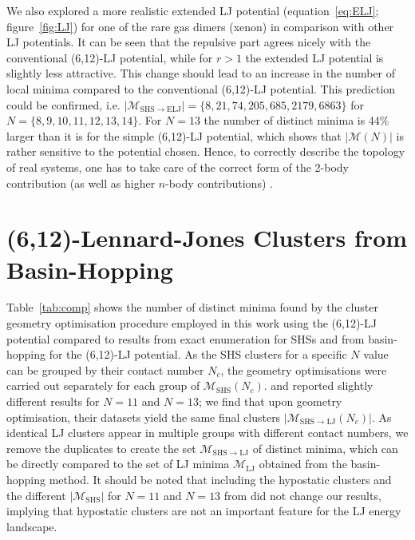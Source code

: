 We also explored a more realistic extended \ac{LJ} potential
(equation~\eqref{eq:ELJ}; figure~\ref{fig:LJ}) for one of the rare gas dimers
(xenon) in comparison with other \ac{LJ} potentials. It can be seen that the
repulsive part agrees nicely with the conventional (6,12)-\ac{LJ} potential,
while for $r > 1$ the extended \ac{LJ} potential is slightly less attractive.
This change should lead to an increase in the number of local minima compared to
the conventional (6,12)-\ac{LJ} potential. This prediction could be confirmed,
i.e. $|\mathcal{M}_\mathrm{SHS\to ELJ}|=\{8,21,74,205,685,2179,6863\}$ for
$N=\{8,9,10,11,12,13,14\}$. For $N=13$ the number of distinct minima is 44\%
larger than it is for the simple (6,12)-\ac{LJ} potential, which shows that
$|\mathcal{M}(N)|$ is rather sensitive to the potential chosen. Hence, to
correctly describe the topology of real systems, one has to take care of the
correct form of the 2-body contribution (as well as higher $n$-body
contributions) \autocite{Schwerdtfeger-2016}.


\section{(6,12)-Lennard-Jones Clusters from Basin-Hopping} 
\label{sec:612LennardJonesClustersfromBasinHopping}

Table~\ref{tab:comp} shows the number of distinct minima found by the cluster
geometry optimisation procedure employed in this work using the (6,12)-\ac{LJ}
potential compared to results from exact enumeration for \ac{SHS}s and from
basin-hopping for the (6,12)-\ac{LJ} potential. As the \ac{SHS} clusters for a
specific $N$ value can be grouped by their contact number $N_c$, the geometry
optimisations were carried out separately for each group of
$\mathcal{M}_\mathrm{SHS}(N_c)$.
\citeauthor{Hoy_Structurefinitesphere_2012}
\autocite{Hoy_Structurefinitesphere_2012,Hoy_Structuredynamicsmodel_2015} and
\citeauthor{Holmes-Cerfon_EnumeratingRigidSphere_2016}\autocite{Holmes-Cerfon_EnumeratingRigidSphere_2016}
reported slightly different results for $N=11$ and $N=13$; we find that upon
geometry optimisation, their datasets yield the same final clusters
$|\mathcal{M}_{\mathrm{SHS\to LJ}}(N_c)|$. As identical \ac{LJ} clusters appear
in multiple groups with different contact numbers, we remove the duplicates to
create the set $\mathcal{M}_\mathrm{SHS\to LJ}$ of distinct minima, which can be
directly compared to the set of \ac{LJ} minima $\mathcal{M}_\mathrm{LJ}$
obtained from the basin-hopping method. It should be noted that including the
hypostatic clusters and the different $|\mathcal{M}_\mathrm{SHS}|$ for $N=11$
and $N=13$ from
\citeauthor{Holmes-Cerfon_EnumeratingRigidSphere_2016}\autocite{Holmes-Cerfon_EnumeratingRigidSphere_2016}
did not change our results, implying that hypostatic clusters are not an
important feature for the \ac{LJ} energy landscape. 


